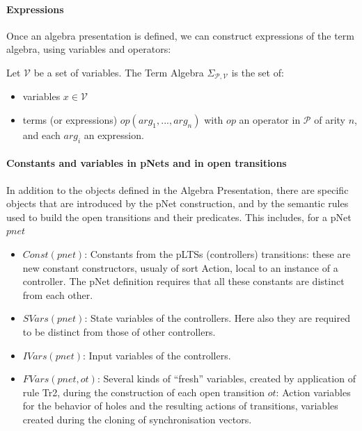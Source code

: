\documentclass{lncs/llncs}
\begin{document}
\paragraph{Expressions}
Once an algebra presentation is defined, we can construct expressions
of the term algebra, using variables and operators:

\begin{definition}
  Let $\mathcal{V}$ be a set of variables. The Term Algebra
  $\Sigma_{\mathcal{P},\mathcal{V}}$ is the set of:
  \begin{itemize}
  \item variables $x \in \mathcal{V}$
  \item terms (or expressions) $op (arg_1, ... , arg_n)$ with $op$ an operator in
  $\mathcal{P}$ of arity $n$, and each $arg_i$ an expression.
  \end{itemize} 
\end{definition}

\paragraph{Constants and variables in pNets and in open transitions}

In addition to the objects defined in the Algebra Presentation, there are
specific objects that are introduced by the pNet construction, and by
the semantic rules used to build the open transitions and their
predicates. This includes, for a pNet $pnet$
\begin{itemize}
\item $Const(pnet)$: Constants from the pLTSs (controllers) transitions: these are
  new constant constructors, usualy of sort Action, local to an
  instance of a controller. The pNet definition requires that all
  these constants are distinct from each other.
\item $SVars(pnet)$: State variables of the controllers. Here also they are required
  to be distinct from those of other controllers.
\item $IVars(pnet)$: Input variables of the controllers.
\item $FVars(pnet,ot)$: Several kinds of ``fresh'' variables, created by application of
  rule Tr2, during the construction of each open transition $ot$:
  Action variables for the behavior of holes and the 
  resulting actions of transitions, variables created during the cloning
  of synchronisation vectors.
\end{itemize}

\def\EPres{\mathcal{P}}
\def\EEnv{\Gamma}
\end{document}

